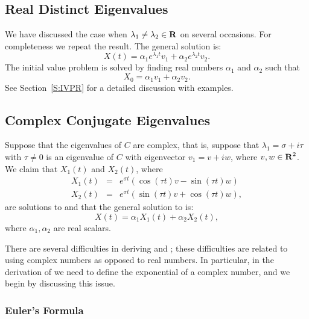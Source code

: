 \subsection*{Real Distinct Eigenvalues}

We have discussed the case when $\lambda_1\neq\lambda_2\in\mbox{$\bf{R}$}$ on several
occasions.  For completeness we repeat the result.  The general solution is:
\begin{equation}  \label{E:RD2}
X(t) = \alpha_1 e^{\lambda_1 t}v_1 + \alpha_2 e^{\lambda_2 t}v_2.
\end{equation}
The initial value problem is solved by finding real numbers $\alpha_1$ and
$\alpha_2$ such that
\[
X_0 = \alpha_1 v_1 + \alpha_2 v_2.
\]
See Section~\ref{S:IVPR} for a detailed discussion with examples.

\subsection*{Complex Conjugate Eigenvalues}

Suppose that the eigenvalues of $C$ are complex, that is, suppose that
$\lambda_1= \sigma+i\tau$ with $\tau\neq 0$ is an eigenvalue of $C$ with
eigenvector $v_1=v+iw$, where $v,w\in\mbox{$\bf{R}$}^2$.  We claim that
$X_1(t)$ and $X_2(t)$, where
\begin{equation}  \label{E:CC1}
\begin{array}{rcl}
X_1(t) & = & e^{\sigma t}(\cos(\tau t)v -\sin(\tau t)w)\\
X_2(t) & = & e^{\sigma t}(\sin(\tau t)v +\cos(\tau t)w),
\end{array}
\end{equation}
are solutions to  and that the general
solution to  is:
\begin{equation}  \label{E:CC2}
X(t) = \alpha_1 X_1(t) + \alpha_2 X_2(t),
\end{equation}
where $\alpha_1, \alpha_2$ are real scalars.

There are several difficulties in deriving  and ; these
difficulties are related to using complex numbers as opposed to real numbers.
In particular, in the derivation of  we need to define the
exponential of a complex number, and we begin by discussing this issue.

\subsubsection*{Euler's Formula}

